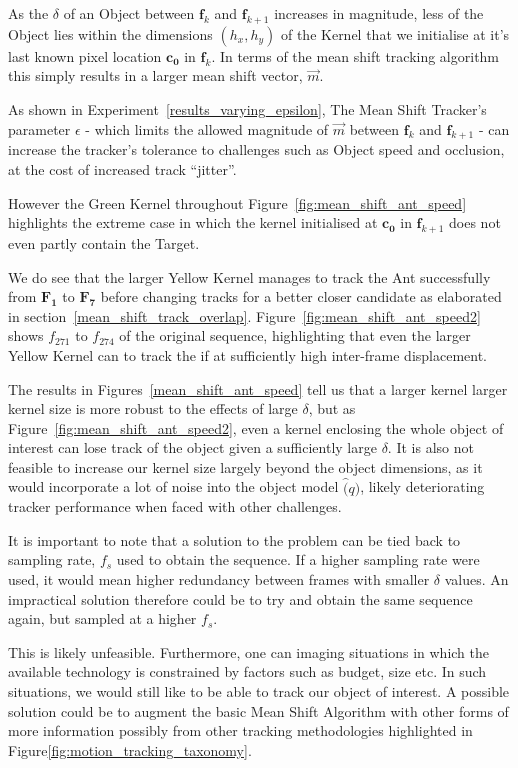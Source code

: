 As the $\delta$ of an Object between $\mathbf{f}_k$ and $\mathbf{f}_{k+1}$ 
increases in magnitude, less of the Object lies within the dimensions
$(h_x,h_y)$ of the Kernel that we initialise at it's last known pixel location
$\mathbf{c_0}$ in $\mathbf{f}_k$. In terms of the mean shift tracking algorithm this simply
results in a larger mean shift vector, $\vec{m}$.

As shown in Experiment~\ref{results_varying_epsilon}, The Mean Shift Tracker's
parameter $\epsilon$ - which limits the allowed magnitude of $\vec{m}$ between
$\mathbf{f}_{k}$ and $\mathbf{f}_{k+1}$ - can increase the tracker's tolerance
to challenges such as Object speed and occlusion, at the
cost of increased track ``jitter''. 

However the Green Kernel throughout Figure~\ref{fig:mean_shift_ant_speed}
highlights the extreme case in which the kernel initialised at $\mathbf{c_0}$ in
$\mathbf{f}_{k+1}$ does not even partly contain the Target.  

We do see that the larger Yellow Kernel manages to track the Ant successfully
from $\mathbf{F_1}$ to $\mathbf{F_7}$ before changing tracks for a better closer
candidate as elaborated in section~\ref{mean_shift_track_overlap}.
Figure~\ref{fig:mean_shift_ant_speed2} shows $f_{271}$ to $f_{274}$ of the original
sequence, highlighting that even the larger Yellow Kernel can to track the if
at sufficiently high inter-frame displacement.

The results in Figures~\ref{mean_shift_ant_speed} tell us
that a larger kernel larger kernel size is more robust to the effects of large
$\delta$, but as Figure~\ref{fig:mean_shift_ant_speed2}, even a
kernel enclosing the whole object of interest can lose track of the object given
a sufficiently large $\delta$. It is also not feasible to increase our kernel
size largely beyond the object dimensions, as it would incorporate a lot of
noise into the object model $\hat(q)$, likely deteriorating tracker performance
when faced with other challenges.

It is important to note that a solution to the problem can be tied back to
sampling rate, $f_s$ used to obtain the sequence. If a higher sampling rate were
used, it would mean higher redundancy between frames with smaller $\delta$
values. An impractical solution therefore could be to try and obtain the
same sequence again, but sampled at a higher $f_s$.

This is likely unfeasible. Furthermore, one can imaging situations in which the
available technology is constrained by factors such as budget, size etc. In such
situations, we would still like to be able to track our object of interest.  A
possible solution could be to augment the basic Mean Shift Algorithm with other
forms of more information possibly from other tracking methodologies highlighted
in Figure\ref{fig:motion_tracking_taxonomy}. 

